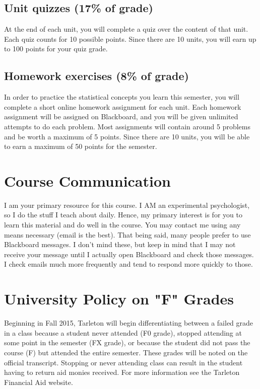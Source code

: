 \documentclass[10pt]{article}
\begin{document}
\subsection*{Unit quizzes (17\% of grade)}
\label{sec-5-2}
At the end of each unit, you will complete a quiz over the content of that 
unit. Each quiz counts for 10 possible points.  Since there are 10 units, 
you will earn up to 100 points for your quiz grade.

\subsection*{Homework exercises (8\% of grade)}
\label{sec-5-3}
In order to practice the statistical concepts you learn this semester, you
will complete a short online homework assignment for each unit.  Each 
homework assignment will be assigned on Blackboard, and you will be given
unlimited attempts to do each problem.  Most assignments will contain 
around 5 problems and be worth a maximum of 5 points.  Since there are 10
units, you will be able to earn a maximum of 50 points for the semester.

\section*{Course Communication}
\label{sec-6}
I am your primary resource for this course. I AM an experimental 
psychologist, so I do the stuff I teach about daily. Hence, my primary 
interest is for you to learn this material and do well in the course. You 
may contact me using any means necessary (email is the best).  That being 
said, many people prefer to use Blackboard messages. I don’t mind these, 
but keep in mind that I may not receive your message until I actually 
open Blackboard and check those messages.  I check emails much more 
frequently and tend to respond more quickly to those.

\section*{University Policy on "F" Grades}
\label{sec-7}
Beginning in Fall 2015, Tarleton will begin differentiating between a 
failed grade in a class because a student never attended (F0 grade), 
stopped attending at some point in the semester (FX grade), or because 
the student did not pass the course (F) but attended the entire semester. 
These grades will be noted on the official transcript. Stopping or never 
attending class can result in the student having to return aid monies 
received.  For more information see the Tarleton Financial Aid website.
\end{document}
